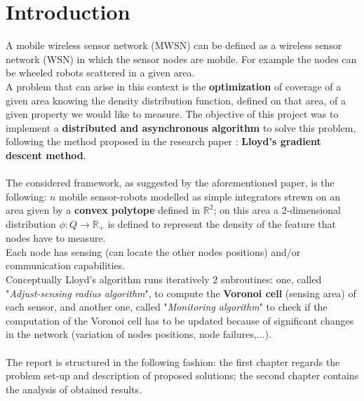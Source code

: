 \documentclass[a4paper,11pt,oneside]{book}
\begin{document}
	
	
	\tableofcontents \thispagestyle{empty}
	\listoffigures\thispagestyle{empty}
	
	\chapter*{Introduction}
	A mobile wireless sensor network (MWSN) can be defined as a wireless sensor network (WSN) in which the sensor nodes are mobile. For example the nodes can be wheeled robots scattered in a given area.\\
	
	A problem that can arise in this context is the \textbf{optimization} of coverage of a given area knowing the density distribution function, defined on that area, of a given property we would like to measure. The objective of this project was to implement a \textbf{distributed and asynchronous algorithm} to solve this problem, following the method proposed in the research paper \cite{K1}: \textbf{Lloyd's gradient descent method}. \\\\
	The considered framework, as suggested by the aforementioned paper, is the following: $n$ mobile sensor-robots modelled as simple integrators strewn on an area given by a \textbf{convex polytope} defined in $\mathbb{R}^2$; on this area a 2-dimensional distribution $\phi:Q\rightarrow \mathbb{R}_+$ is defined to represent the density of the feature that nodes have to measure.\\ Each node has sensing (can locate the other nodes positions) and/or communication capabilities.  \\
	Conceptually Lloyd's algorithm runs iteratively 2 subroutines: one, called "\emph{Adjust-sensing radius algorithm}", to compute the \textbf{Voronoi cell} (sensing area) of each sensor, and another one, called "\emph{Monitoring algorithm}" to check if the computation of the Voronoi cell has to be updated because of significant changes in the network (variation of nodes positions, node failures,...).\\\\
	The report is structured in the following fashion: the first chapter regards the problem set-up and description of proposed solutions; the second chapter contains the analysis of obtained results.\\  
	
	
\end{document}
